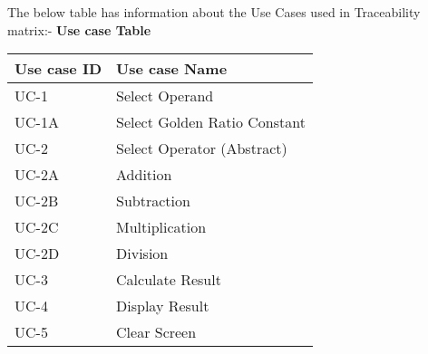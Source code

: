 \documentclass[12pt,a4paper]{article}
\begin{document}
\newline
The below table has information about the Use Cases used in Traceability matrix:-\newline
\textbf{Use case Table}
\begin{table}[h]
\centering
\begin{tabular}{|l|l|}
\hline
\textbf{Use case ID} & \textbf{Use case Name} \\
\hline
UC-1 & Select Operand \\
\hline
UC-1A & Select Golden Ratio Constant \\
\hline
UC-2 & Select Operator (Abstract) \\
\hline
UC-2A & Addition \\
\hline
UC-2B & Subtraction \\
\hline
UC-2C & Multiplication \\
\hline
UC-2D & Division \\
\hline
UC-3 & Calculate Result \\
\hline
UC-4 & Display Result \\
\hline
UC-5 & Clear Screen\\
\hline
\end{tabular}
\end{table}
\newpage
\end{document}
